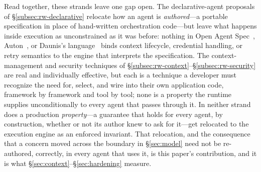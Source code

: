 Read together, these strands leave one gap open. The declarative-agent
proposals of \S\ref{subsec:rw-declarative} relocate how an agent is
\emph{authored}---a portable specification in place of hand-written
orchestration code---but leave what happens inside execution as
unconstrained as it was before: nothing in Open Agent
Spec~\cite{amini2025}, Auton~\cite{cao2026}, or Daunis's
language~\cite{daunis2025} binds context lifecycle, credential handling,
or retry semantics to the engine that interprets the specification. The
context-management and security techniques of
\S\ref{subsec:rw-context}--\S\ref{subsec:rw-security} are real and
individually effective, but each is a technique a developer must
recognize the need for, select, and wire into their own application
code, framework by framework and tool by tool; none is a property the
runtime supplies unconditionally to every agent that passes through it.
In neither strand does a production \emph{property}---a guarantee that
holds for every agent, by construction, whether or not its author knew to
ask for it---get relocated to the execution engine as an enforced
invariant. That relocation, and the consequence that a concern moved
across the boundary in \S\ref{sec:model} need not be re-authored,
correctly, in every agent that uses it, is this paper's contribution, and
it is what \S\ref{sec:context}--\S\ref{sec:hardening} measure.
